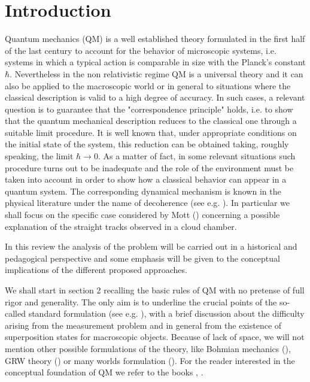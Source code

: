 \documentclass[12pt,reqno]{amsart}
\newcommand{\n}{\relax}
\newcommand{\vs}{\vspace{0.5cm}}
\numberwithin{equation}{section}
\begin{document}
\vs
\vs

\section{Introduction }


\vs
\n
Quantum mechanics (QM) is a well established theory formulated in the first half of the last century to account for the behavior of microscopic systems, i.e. systems in which a typical action is comparable in size with the Planck's constant $\hbar$. Nevertheless in the non relativistic regime QM is a universal theory  and it can also be applied to the macroscopic world or in general to situations where the classical description is valid to a high degree of accuracy. 
In such cases, a relevant question is to guarantee that the "correspondence principle" holds, i.e.   to show that the quantum mechanical description reduces to the classical one through a suitable limit procedure. It is well known that,  under appropriate conditions on the initial state of the system, this reduction can be obtained taking, roughly speaking,  the limit $\hbar \rightarrow 0$. 
As a matter of fact, in some relevant situations such procedure turns out to be inadequate and the role of the environment  
must be taken into account in order to show how  a classical behavior can appear in  a quantum system. The corresponding   dynamical mechanism is known in the physical literature under the name of decoherence (see e.g. \cite{gjkksz}). In particular we shall focus on the specific case considered by Mott (\cite{m}) concerning a possible explanation of the straight tracks observed in a cloud chamber.

\n
In this review the analysis of the problem will be carried out in a historical and pedagogical perspective and some emphasis will be given to the conceptual implications of the different proposed approaches.

\n
We shall start in section 2 recalling the basic rules of QM with no pretense of full rigor and generality. The only aim is to underline the crucial points of the so-called standard formulation (see e.g. \cite{s}), with a brief discussion about the difficulty arising from the measurement problem and in general from the existence of superposition states for macroscopic objects. 
Because of lack of space, we will not mention  other possible formulations of the theory, like Bohmian mechanics (\cite{dgz}),  GRW theory (\cite{grw}) or  many worlds formulation (\cite{e}). For the reader interested in the conceptual foundation of QM we refer to the books \cite{b}, \cite{g}.
\end{document}
